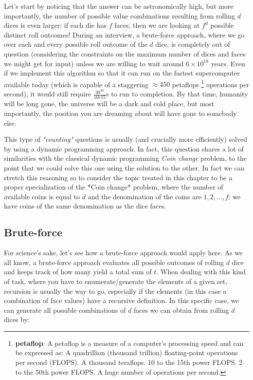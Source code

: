 Let's start by noticing that the answer can be astronomically high, but more importantly, the number of possible value combinations resulting from rolling $d$ dices is even larger: if each die has
$f$ faces, then we are looking at $f^d$ possible distinct roll outcomes! 
During an interview, a brute-force approach, where we go over each and every possible roll outcome of the $d$ dice, is completely out of question  (considering the constraints on the maximum number of dices and faces we might get for input) unless we are willing to wait around  $6 \times 10^{18}$ years. Even if we implement this algorithm so that it can run on the fastest supercomputer available today (which is capable of a staggering $\approx450$ petaflops \footnote{\textbf{petaflop}: A petaflop is a measure of a computer's processing speed and can be expressed as: A quadrillion (thousand trillion) floating-point operations per second (FLOPS). A thousand teraflops. 10 to the 15th power FLOPS. 2 to the 50th power FLOPS. A huge number of operations per second.} operations per second), it would still require $\frac{30^{30}}{10e15}$s to run to completion. By that time, humanity will be long gone, the universe will be a dark and cold place, but most importantly, the position you are dreaming about will have gone to somebody else.

This type of \textit{"counting"} questions is usually (and crucially more efficiently) solved by using a dynamic programming
approach. In fact, this question shares a lot of similarities with the classical dynamic programming
\textit{Coin change} problem, to the point that we
could solve this one using the solution to the other. In fact we can stretch this reasoning so to consider the topic treated in this chapter to be a proper specialization of the *Coin
change* problem, where the number of available coins is equal to $d$
and the denomination of the coins are $1,2,\ldots,f$: we have coins of the same denomination as the
dice faces.




\subsection{Brute-force}
\label{dice_rolls:sec:bruteforce}


For science's sake, let's see how a brute-force approach would apply here. As we all know, a brute-force approach evaluates all possible outcomes of rolling $d$ dice and keeps
track of how many yield a total sum of $t$. When dealing with this kind of task, where you have to
enumerate/generate the elements of a given set, recursion is usually the way to go, especially if the elements (in this case a combination of face values) have a recursive definition.
In this specific case, we can generate all possible combinations of $d$ faces we can obtain from rolling $d$ dices by:


